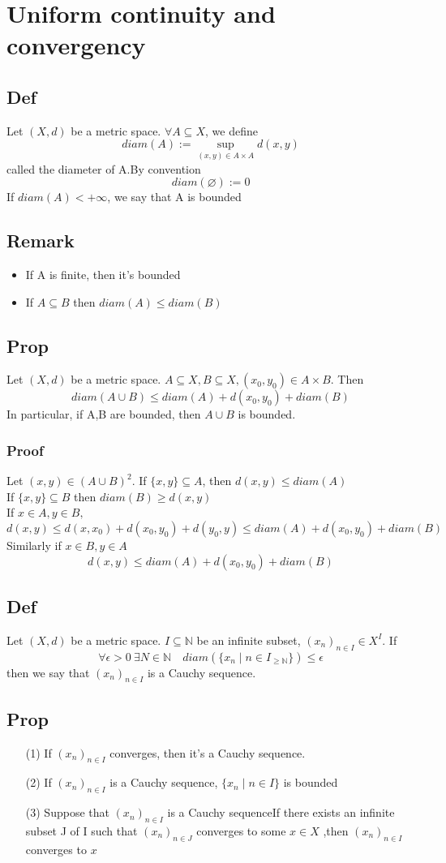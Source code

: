 \documentclass{book}
\begin{document}
\chapter{Uniform continuity and convergency}
\section{Def}
Let $(X,d)$ be a metric space. $\forall A\subseteq X$, we define $$diam(A):=\sup\limits_{(x,y)\in A\times A}d(x,y)$$ called the diameter of A.By convention $$diam(\varnothing):=0$$ If $diam(A)<+\infty$, we say that A is bounded
\section{Remark}
\begin{itemize}
    \item If A is finite, then it's bounded
    \item If $A\subseteq B$ then $diam(A)\leq diam(B)$
\end{itemize}
\section{Prop}Let $(X,d)$ be a metric space. $A\subseteq X, B\subseteq X,(x_0, y_0)\in A\times B$. Then $$diam(A\cup B)\leq diam(A)+d(x_0,y_0)+diam(B)$$ In particular, if A,B are bounded, then $A\cup B$ is bounded.
\subsection*{Proof}
Let $(x,y)\in (A\cup B)^2$. If $\{x,y\}\subseteq A$, then $d(x,y)\leq diam(A)$\\If $\{x,y\}\subseteq B$ then $diam(B)\geq d(x,y)$
\\ If $x\in A,y\in B,$$$d(x,y)\leq d(x,x_0)+d(x_0,y_0)+d(y_0,y)\leq diam(A)+d(x_0,y_0)+diam(B)$$ Similarly if $x\in B,y\in A$$$d(x,y)\leq  diam(A)+d(x_0,y_0)+diam(B)$$
\section{Def}Let $(X,d)$ be a metric space. $I\subseteq \mathbb{N}$ be an infinite subset, $(x_n)_{n\in I}\in X^I$. If $$\forall\epsilon>0\ \exists N\in \mathbb{N} \quad diam(\{x_n\mid n\in I_{\geq\mathbb{N} }\})\leq\epsilon$$ then we say that $(x_n)_{n\in I}$ is a Cauchy sequence.
\section{Prop}
\begin{itemize}
    \item [(1)]If $(x_n)_{n\in I}$ converges, then it's a Cauchy sequence.
    \item [(2)]If $(x_n)_{n\in I}$ is a Cauchy sequence, $\{x_n\mid n\in I\}$ is bounded
    \item [(3)] Suppose that $(x_n)_{n\in I}$ is a Cauchy sequenceIf there exists an infinite subset J of I such that $(x_n)_{n\in J}$ converges to some $x\in X$ ,then $(x_n)_{n\in I}$ converges to $x$
\end{itemize}
\end{document}
